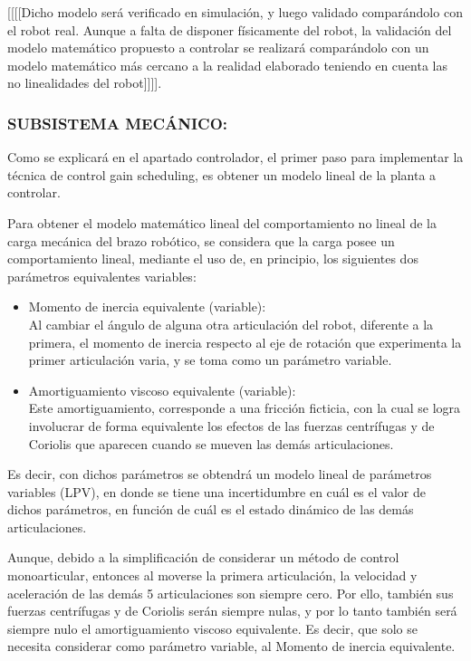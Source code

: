\documentclass{article}
\begin{document}
[[[[Dicho modelo será verificado en simulación, y luego validado comparándolo con el robot real. Aunque a falta de disponer físicamente del robot, la validación del modelo matemático propuesto a controlar se realizará comparándolo con un modelo matemático más cercano a la realidad elaborado teniendo en cuenta las no linealidades del robot]]]].



\subsubsection*{SUBSISTEMA MECÁNICO:}
\label{sec:SUBSISTEMA MECÁNICO:}

Como se explicará en el apartado controlador, el primer paso para implementar la técnica de control gain scheduling, es obtener un modelo lineal de la planta a controlar.

Para obtener el modelo matemático lineal del comportamiento no lineal de la carga mecánica del brazo robótico, se considera que
la carga posee un comportamiento lineal, mediante el uso de, en principio, los siguientes  dos parámetros equivalentes variables:
\begin{itemize}
    \item Momento de inercia equivalente (variable):
    \\ Al cambiar el ángulo de alguna otra articulación del robot, diferente a la primera, el momento de inercia respecto al eje de rotación que experimenta la primer articulación varia, y se toma como un parámetro variable.

    \item Amortiguamiento viscoso equivalente (variable):
    \\ Este amortiguamiento, corresponde a una fricción ficticia, con la cual se logra involucrar de forma equivalente los efectos de las fuerzas centrífugas y de Coriolis que aparecen cuando se mueven las demás articulaciones.
\end{itemize}

Es decir, con dichos parámetros se obtendrá un modelo lineal de parámetros variables (LPV), en donde se tiene una incertidumbre en cuál es el valor de dichos parámetros, en función de cuál es el estado dinámico de las demás articulaciones.

Aunque, debido a la simplificación de considerar un método de control monoarticular, entonces al moverse la primera articulación, la velocidad y aceleración de las demás 5 articulaciones son siempre cero. Por ello, también sus fuerzas centrífugas y de Coriolis serán siempre nulas, y por lo tanto también será siempre nulo el amortiguamiento viscoso equivalente. Es decir, que solo se necesita considerar como parámetro variable, al Momento de inercia equivalente.
\end{document}

